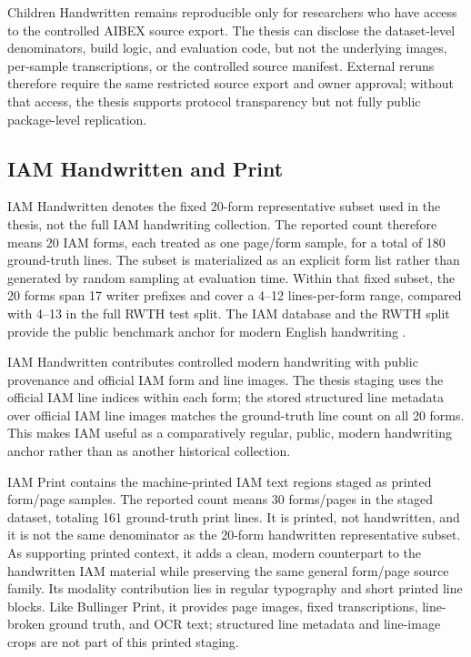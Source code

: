 Children Handwritten remains reproducible only for researchers who have access to the controlled AIBEX source export. The thesis can disclose the dataset-level denominators, build logic, and evaluation code, but not the underlying images, per-sample transcriptions, or the controlled source manifest. External reruns therefore require the same restricted source export and owner approval; without that access, the thesis supports protocol transparency but not fully public package-level replication.

\subsection{IAM Handwritten and Print}
\label{sec:data_iam}

IAM Handwritten denotes the fixed 20-form representative subset used in the thesis, not the full IAM handwriting collection. The reported count therefore means 20 IAM forms, each treated as one page/form sample, for a total of 180 ground-truth lines. The subset is materialized as an explicit form list rather than generated by random sampling at evaluation time. Within that fixed subset, the 20 forms span 17 writer prefixes and cover a 4--12 lines-per-form range, compared with 4--13 in the full RWTH test split. The IAM database and the RWTH split provide the public benchmark anchor for modern English handwriting .

IAM Handwritten contributes controlled modern handwriting with public provenance and official IAM form and line images. The thesis staging uses the official IAM line indices within each form; the stored structured line metadata over official IAM line images matches the ground-truth line count on all 20 forms. This makes IAM useful as a comparatively regular, public, modern handwriting anchor rather than as another historical collection.

IAM Print contains the machine-printed IAM text regions staged as printed form/page samples. The reported count means 30 forms/pages in the staged dataset, totaling 161 ground-truth print lines. It is printed, not handwritten, and it is not the same denominator as the 20-form handwritten representative subset. As supporting printed context, it adds a clean, modern counterpart to the handwritten IAM material while preserving the same general form/page source family. Its modality contribution lies in regular typography and short printed line blocks. Like Bullinger Print, it provides page images, fixed transcriptions, line-broken ground truth, and OCR text; structured line metadata and line-image crops are not part of this printed staging.

